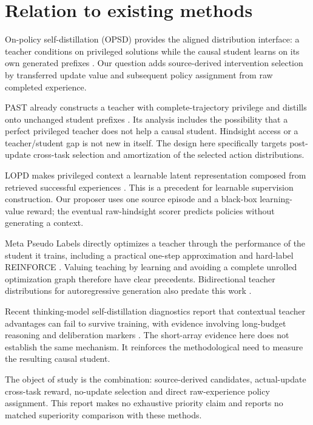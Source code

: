 \documentclass[11pt,letterpaper]{article}
\begin{document}
\section{Relation to existing methods}

On-policy self-distillation (OPSD) provides the aligned distribution interface: a teacher conditions on privileged solutions while the causal student learns on its own generated prefixes \citep{zhao2026selfdistilled}. Our question adds source-derived intervention selection by transferred update value and subsequent policy assignment from raw completed experience.

PAST already constructs a teacher with complete-trajectory privilege and distills onto unchanged student prefixes \citep{feng2026past}. Its analysis includes the possibility that a perfect privileged teacher does not help a causal student. Hindsight access or a teacher/student gap is not new in itself. The design here specifically targets post-update cross-task selection and amortization of the selected action distributions.

LOPD makes privileged context a learnable latent representation composed from retrieved successful experiences \citep{zhang2026latent}. This is a precedent for learnable supervision construction. Our proposer uses one source episode and a black-box learning-value reward; the eventual raw-hindsight scorer predicts policies without generating a context.

Meta Pseudo Labels directly optimizes a teacher through the performance of the student it trains, including a practical one-step approximation and hard-label REINFORCE \citep{pham2021metapseudolabels}. Valuing teaching by learning and avoiding a complete unrolled optimization graph therefore have clear precedents. Bidirectional teacher distributions for autoregressive generation also predate this work \citep{chen2020bertgeneration}.

Recent thinking-model self-distillation diagnostics report that contextual teacher advantages can fail to survive training, with evidence involving long-budget reasoning and deliberation markers \citep{kaur2026rethinking}. The short-array evidence here does not establish the same mechanism. It reinforces the methodological need to measure the resulting causal student.

The object of study is the combination: source-derived candidates, actual-update cross-task reward, no-update selection and direct raw-experience policy assignment. This report makes no exhaustive priority claim and reports no matched superiority comparison with these methods.
\end{document}
